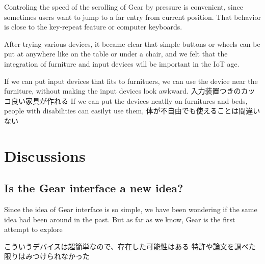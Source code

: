 \documentclass{article}
\begin{document}
Controling the speed of the scrolling of Gear by pressure is convenient,
since sometimes users want to jump to a far entry from current position.
That behavior is close to the key-repeat feature or computer keyboards.



After trying various devices, it became clear that simple buttons or
wheels can be put at anywhere like on the table or under a chair, and
we felt that the integration of furniture and input devices will be
important in the IoT age.

If we can put input devices that fits to furnituers, we can use the device near the furniture, without making the input devices look awkward.
  入力装置つきのカッコ良い家具が作れる
 If we can put the devices neatlly on furnitures and beds, people with disabilities can easilyt use them, 
 体が不自由でも使えることは間違いない

\section{Discussions}

\subsection{Is the Gear interface a new idea?}
  Since the idea of Gear interface is so simple, we have been wondering if the same idea had been around in the past.
  But as far as we know, Gear is the first attempt to explore 

 こういうデバイスは超簡単なので、存在した可能性はある
 特許や論文を調べた限りはみつけられなかった
\end{document}
